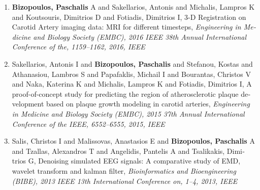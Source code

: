 \begin{enumerate}
	\item \textlatin{\textbf{Bizopoulos, Paschalis} A and Sakellarios, Antonis and Michalis, Lampros K and Koutsouris, Dimitrios D and Fotiadis, Dimitrios I, 3-D Registration on Carotid Artery imaging data: MRI for different timesteps, \textit{Engineering in Medicine and Biology Society (EMBC), 2016 IEEE 38th Annual International Conference of the, 1159--1162, 2016, IEEE}}
	\item \textlatin{Sakellarios, Antonis I and \textbf{Bizopoulos, Paschalis} and Stefanou, Kostas and Athanasiou, Lambros S and Papafaklis, Michail I and Bourantas, Christos V and Naka, Katerina K and Michalis, Lampros K and Fotiadis, Dimitrios I, A proof-of-concept study for predicting the region of atherosclerotic plaque development based on plaque growth modeling in carotid arteries, \textit{Engineering in Medicine and Biology Society (EMBC), 2015 37th Annual International Conference of the IEEE, 6552--6555, 2015, IEEE}}
	\item \textlatin{Salis, Christos I and Malissovas, Anastasios E and \textbf{Bizopoulos, Paschalis} A and Tzallas, Alexandros T and Angelidis, Pantelis A and Tsalikakis, Dimitrios G, Denoising simulated EEG signals: A comparative study of EMD, wavelet transform and kalman filter, \textit{Bioinformatics and Bioengineering (BIBE), 2013 IEEE 13th International Conference on, 1--4, 2013, IEEE}}
\end{enumerate}
